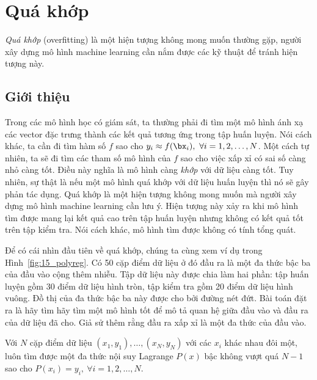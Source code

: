 \chapter{Quá khớp}
\label{cha:overfitting}

 
\textit{Quá khớp} (overfitting) là một hiện tượng không mong muốn thường gặp, người xây dựng mô hình
machine learning cần nắm được các kỹ thuật để tránh hiện tượng này.

\section{Giới thiệu}

Trong các mô hình học có giám sát, ta thường
phải đi tìm một mô hình ánh xạ các vector đặc trưng thành các kết quả tương ứng
trong tập huấn luyện. Nói cách khác, ta cần đi tìm hàm số $f$ sao cho $y_i \approx f(\bx_i),
~\forall i = 1, 2,
\dots, N$. Một cách tự nhiên, ta sẽ đi tìm các tham số mô hình của $f$ sao cho
việc xấp xỉ có sai số càng nhỏ càng tốt. Điều này nghĩa là mô hình càng
\textit{khớp} với dữ liệu càng tốt. Tuy nhiên, sự thật là nếu một mô hình {quá
khớp} với dữ liệu huấn luyện thì nó sẽ gây phản tác dụng. Quá khớp là một hiện tượng không mong muốn mà người xây dựng mô hình machine learning cần lưu ý.
Hiện tượng này xảy ra khi mô hình tìm được mang lại kết quả cao trên tập huấn
luyện nhưng không có kết quả tốt trên tập kiểm tra. Nói cách khác, mô hình tìm được không có tính tổng quát. 

Để có cái nhìn đầu tiên về quá khớp, chúng ta cùng xem ví dụ trong
Hình~\ref{fig:15_polyreg}. Có 50 cặp điểm dữ liệu ở đó đầu ra là một đa thức bậc
ba của đầu vào cộng thêm nhiễu. Tập dữ liệu này được chia làm hai phần: tập huấn luyện gồm 30 điểm
dữ liệu hình tròn, tập kiểm tra gồm 20 điểm dữ liệu hình vuông. Đồ thị của đa thức bậc ba này được cho bởi đường nét đứt. Bài toán đặt ra là hãy tìm hãy tìm
một mô hình tốt để mô tả quan hệ giữa đầu vào và đầu ra của dữ liệu đã cho. Giả sử thêm rằng đầu ra xấp xỉ là một đa thức của đầu vào. 

 
Với $N$ cặp điểm dữ liệu $(x_1, y_1), \dots, (x_N, y_N)$ với các $x_i$ khác nhau
đôi một, luôn tìm được một {đa thức nội suy Lagrange} $P(x)$ bậc không
vượt quá $N-1$ sao cho $P(x_i) = y_i, ~\forall i = 1, 2, \dots, N$.
 

